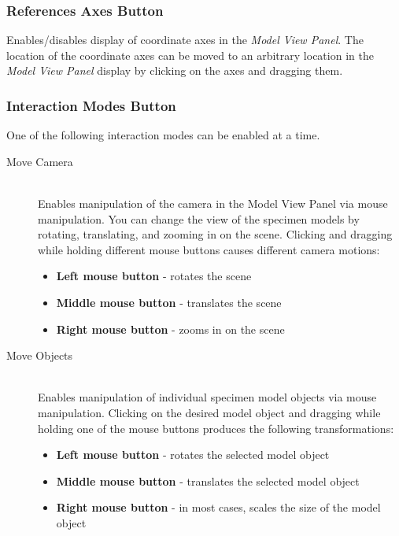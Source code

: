 \documentclass[11pt,titlepage,twoside]{article}
\begin{document}
\subsubsection{References Axes Button}

Enables/disables display of coordinate axes in the \emph{Model View Panel}. The location of the coordinate axes can be moved to an arbitrary location in the \emph{Model View Panel} display by clicking on the axes and dragging them.
  
\subsubsection{Interaction Modes Button}
  
One of the following interaction modes can be enabled at a time.

\begin{description}

  \item[Move Camera] \hfill \\
  Enables manipulation of the camera in the Model View Panel via mouse manipulation. You can change the view of the specimen models by rotating, translating, and zooming in on the scene. Clicking and dragging while holding different mouse buttons causes different camera motions:

\begin{itemize}
\item \textbf{Left mouse button} - rotates the scene
\item \textbf{Middle mouse button} - translates the scene
\item \textbf{Right mouse button} - zooms in on the scene
\end{itemize}

  \item[Move Objects] \hfill \\
  Enables manipulation of individual specimen model objects via mouse manipulation. Clicking on the desired model object and dragging while holding one of the mouse buttons produces the following transformations:
  
\begin{itemize}
\item \textbf{Left mouse button} - rotates the selected model object
\item \textbf{Middle mouse button} - translates the selected model object
\item \textbf{Right mouse button} - in most cases, scales the size of the model object
\end{itemize}

\end{description}
\end{document}

